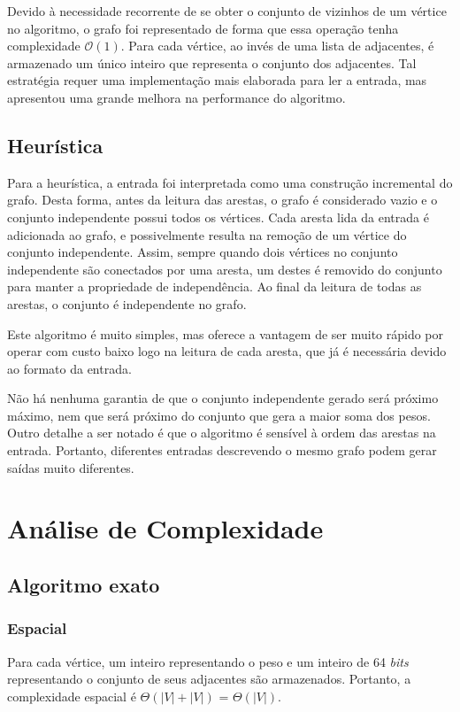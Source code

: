 \documentclass{article}
\begin{document}
Devido à necessidade recorrente de se obter o conjunto de vizinhos de um vértice no algoritmo, o grafo foi representado de forma que essa operação tenha complexidade $\mathcal{O}(1)$. Para cada vértice, ao invés de uma lista de adjacentes, é armazenado um único inteiro que representa o conjunto dos adjacentes. Tal estratégia requer uma implementação mais elaborada para ler a entrada, mas apresentou uma grande melhora na performance do algoritmo.


\pagebreak


\subsection{Heurística}
Para a heurística, a entrada foi interpretada como uma construção incremental do grafo. Desta forma, antes da leitura das arestas, o grafo é considerado vazio e o conjunto independente possui todos os vértices. Cada aresta lida da entrada é adicionada ao grafo, e possivelmente resulta na remoção de um vértice do conjunto independente. Assim, sempre quando dois vértices no conjunto independente são conectados por uma aresta, um destes é removido do conjunto para manter a propriedade de independência. Ao final da leitura de todas as arestas, o conjunto é independente no grafo.

Este algoritmo é muito simples, mas oferece a vantagem de ser muito rápido por operar com custo baixo logo na leitura de cada aresta, que já é necessária devido ao formato da entrada.

Não há nenhuma garantia de que o conjunto independente gerado será próximo máximo, nem que será próximo do conjunto que gera a maior soma dos pesos. Outro detalhe a ser notado é que o algoritmo é sensível à ordem das arestas na entrada. Portanto, diferentes entradas descrevendo o mesmo grafo podem gerar saídas muito diferentes.

\section{Análise de Complexidade}

\subsection{Algoritmo exato}
\subsubsection{Espacial}
Para cada vértice, um inteiro representando o peso e um inteiro de 64 \textit{bits} representando o conjunto de seus adjacentes são armazenados. Portanto, a complexidade espacial é $\Theta(|V| + |V|)$ = $\Theta(|V|)$.
\end{document}

